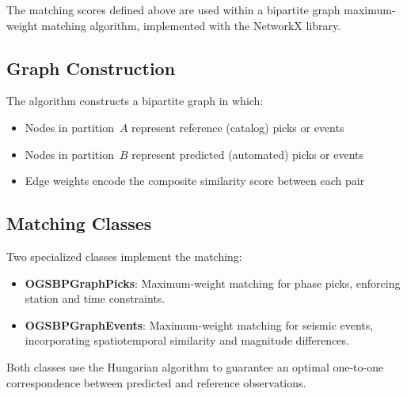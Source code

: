 The matching scores defined above are used within a bipartite graph
maximum-weight matching algorithm, implemented with the NetworkX library.

\subsection{Graph Construction}
The algorithm constructs a bipartite graph in which:
\begin{itemize}
  \item Nodes in partition~$A$ represent reference (catalog) picks or events
  \item Nodes in partition~$B$ represent predicted (automated) picks or events
  \item Edge weights encode the composite similarity score between each pair
\end{itemize}

\subsection{Matching Classes}
Two specialized classes implement the matching:
\begin{itemize}
  \item \textbf{OGSBPGraphPicks}: Maximum-weight matching for phase picks,
    enforcing station and time constraints.
  \item \textbf{OGSBPGraphEvents}: Maximum-weight matching for seismic
    events, incorporating spatiotemporal similarity and magnitude differences.
\end{itemize}
Both classes use the Hungarian algorithm to guarantee an optimal one-to-one
correspondence between predicted and reference observations.
